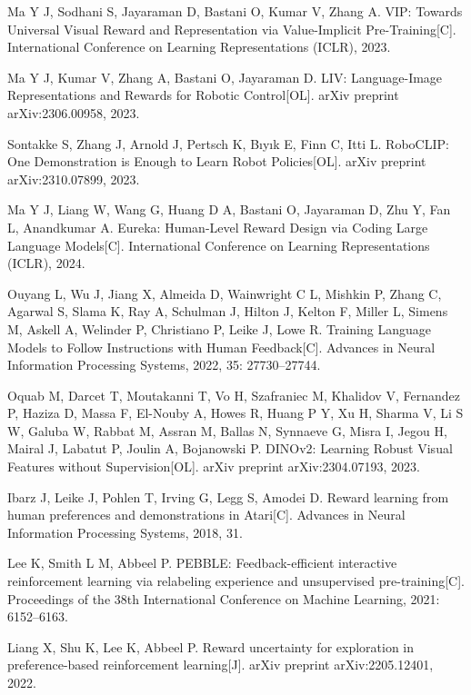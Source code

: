 Ma Y J, Sodhani S, Jayaraman D, Bastani O, Kumar V, Zhang A.
VIP: Towards Universal Visual Reward and Representation via Value-Implicit Pre-Training[C].
International Conference on Learning Representations (ICLR), 2023.

Ma Y J, Kumar V, Zhang A, Bastani O, Jayaraman D.
LIV: Language-Image Representations and Rewards for Robotic Control[OL].
arXiv preprint arXiv:2306.00958, 2023.

Sontakke S, Zhang J, Arnold J, Pertsch K, Bıyık E, Finn C, Itti L.
RoboCLIP: One Demonstration is Enough to Learn Robot Policies[OL].
arXiv preprint arXiv:2310.07899, 2023.

Ma Y J, Liang W, Wang G, Huang D A, Bastani O, Jayaraman D, Zhu Y, Fan L, Anandkumar A.
Eureka: Human-Level Reward Design via Coding Large Language Models[C].
International Conference on Learning Representations (ICLR), 2024.

Ouyang L, Wu J, Jiang X, Almeida D, Wainwright C L, Mishkin P, Zhang C, Agarwal S, Slama K, Ray A, Schulman J, Hilton J, Kelton F, Miller L, Simens M, Askell A, Welinder P, Christiano P, Leike J, Lowe R.
Training Language Models to Follow Instructions with Human Feedback[C].
Advances in Neural Information Processing Systems, 2022, 35: 27730--27744.

Oquab M, Darcet T, Moutakanni T, Vo H, Szafraniec M, Khalidov V, Fernandez P, Haziza D, Massa F, El-Nouby A, Howes R, Huang P Y, Xu H, Sharma V, Li S W, Galuba W, Rabbat M, Assran M, Ballas N, Synnaeve G, Misra I, Jegou H, Mairal J, Labatut P, Joulin A, Bojanowski P.
DINOv2: Learning Robust Visual Features without Supervision[OL].
arXiv preprint arXiv:2304.07193, 2023.

Ibarz J, Leike J, Pohlen T, Irving G, Legg S, Amodei D.
Reward learning from human preferences and demonstrations in Atari[C].
Advances in Neural Information Processing Systems, 2018, 31.

Lee K, Smith L M, Abbeel P.
PEBBLE: Feedback-efficient interactive reinforcement learning via relabeling experience and unsupervised pre-training[C].
Proceedings of the 38th International Conference on Machine Learning, 2021: 6152--6163.

Liang X, Shu K, Lee K, Abbeel P.
Reward uncertainty for exploration in preference-based reinforcement learning[J].
arXiv preprint arXiv:2205.12401, 2022.

